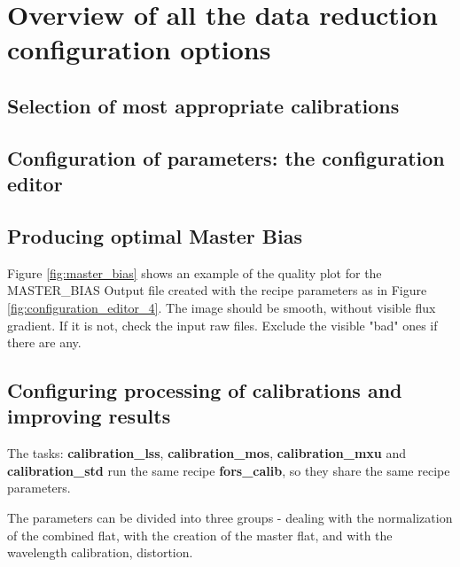 \section{Overview of all the data reduction configuration options}
\label{sec:configuration_overview}

\subsection{Selection of most appropriate calibrations}



\subsection{Configuration of parameters: the configuration editor}
\label{sec:configuration_editor}




\subsection{Producing optimal Master Bias}
\label{sec:configuration_bias}

Figure \ref{fig:master_bias} shows an example of the quality plot for the MASTER\_BIAS Output file created with the recipe parameters as in Figure \ref{fig:configuration_editor_4}. The image should be smooth, without visible flux gradient. If it is not, check the input raw files. Exclude the visible "bad" ones if there are any.


\subsection{Configuring processing of calibrations and improving results}
\label{sec:configuration_calibration}

The tasks: {\bf calibration\_lss}, {\bf calibration\_mos}, {\bf calibration\_mxu} and {\bf calibration\_std} run the same recipe {\bf fors\_calib}, so they share the same recipe parameters.

The parameters can be divided into three groups - dealing with the normalization of the combined flat, with the creation of the master flat, and with the wavelength calibration, distortion.


